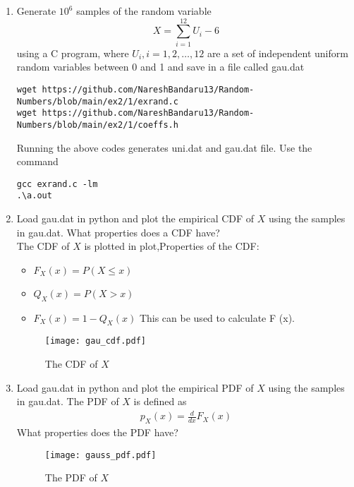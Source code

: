 \documentclass[journal,12pt,twocolumn]{IEEEtran}
\renewcommand\thesection{\arabic{section}}
\begin{document}
\begin{enumerate}[label=\thesection.\arabic*,ref=\thesection.\theenumi]

\item
Generate $10^6$ samples of the random variable
%
\begin{equation}
X = \sum_{i=1}^{12}U_i -6
\end{equation}
%
using a C program, where $U_i, i = 1,2,\dots, 12$ are  a set of independent uniform random variables between 0 and 1
and save in a file called gau.dat
\\
\solution
\begin{lstlisting}
wget https://github.com/NareshBandaru13/Random-Numbers/blob/main/ex2/1/exrand.c
wget https://github.com/NareshBandaru13/Random-Numbers/blob/main/ex2/1/coeffs.h
\end{lstlisting}
Running the above codes generates uni.dat and gau.dat file.
Use the command 
\begin{lstlisting}
gcc exrand.c -lm
.\a.out
\end{lstlisting}

\item
Load gau.dat in python and plot the empirical CDF of $X$ using the samples in gau.dat. What properties does a CDF have?
\\
\solution 
The CDF of $X$ is plotted in plot,Properties of the CDF:
\begin{itemize}
\item $F_X (x)=P(X \leq x) $
\item $Q_X (x) = P(X > x)$
\item  $F_X (x) = 1 - Q_X (x)$ This can be used to calculate F (x).
\end{itemize}

\begin{figure}[H]
\centering
\texttt{[image: gau\_cdf.pdf]}
\caption{The CDF of $X$}
\label{fig:gau_cdf}
\end{figure}

\item
Load gau.dat in python and plot the empirical PDF of $X$ using the samples in gau.dat. The PDF of $X$ is defined as
\begin{align}
p_{X}(x) = \frac{d}{dx}F_{X}(x)
\end{align}
What properties does the PDF have?
\\
\begin{figure}[H]
\centering
\texttt{[image: gauss\_pdf.pdf]}
\caption{The PDF of $X$}
\label{fig:gauss_pdf}
\end{figure}


\end{enumerate}
\end{document}
